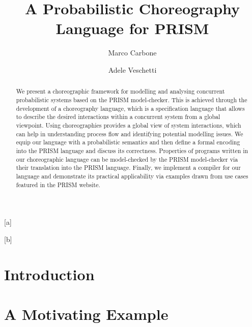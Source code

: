 \documentclass{lmcs}
\begin{document}
\title[A Probabilistic Choreography Language for PRISM]
{A Probabilistic Choreography Language for PRISM}

\author[M.~Carbone]{Marco Carbone}[a]
\author[A.~Veschetti]{Adele Veschetti}[b]

\address{Computer Science Department, IT University of Copenhagen, Rued Langgaards Vej 7, 2300 Copenhagen S, Denmark}	%

\address{Department of Computer Science, TU Darmstadt, Hochschulstraße 10, 64289 Darmstadt, Germany} %

\begin{abstract}
  \noindent We present a choreographic framework for modelling and
  analysing concurrent probabilistic systems based on the PRISM
  model-checker. This is achieved through the development of a
  choreography language, which is a specification language that allows
  to describe the desired interactions within a concurrent system from
  a global viewpoint. Using choreographies provides a global view of
  system interactions, which can help in understanding process flow
  and identifying potential modelling issues.  We equip our language
  with a probabilistic semantics and then define a formal encoding
  into the PRISM language and discuss its correctness. Properties of
  programs written in our choreographic language can be model-checked
  by the PRISM model-checker via their translation into the PRISM
  language.  Finally, we implement a compiler for our language and
  demonstrate its practical applicability via examples drawn from use
  cases featured in the PRISM website.
\end{abstract}

\maketitle

\section{Introduction}\label{sec:intro}


\section{A Motivating Example}\label{sec:example}

\end{document}
